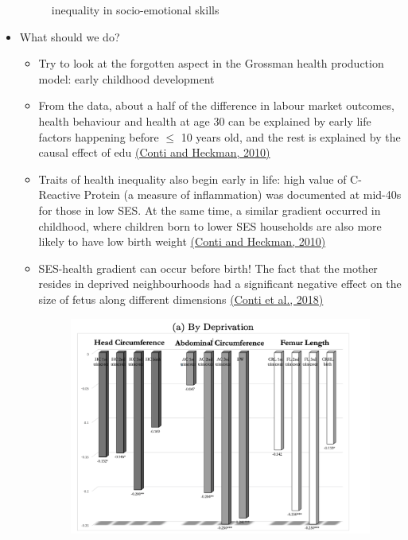 \begin{itemize}
\begin{figure}[H]
            \caption{inequality in socio-emotional skills}
            \label{SMinequality}
        \end{figure}
        \item What should we do?
        \begin{itemize}
            \item Try to look at the forgotten aspect in the Grossman health production model: early childhood development
            \item From the data, about a half of the difference in labour market outcomes, health behaviour and health at age 30 can be explained by early life factors happening before $\leq$ 10 years old, and the rest is explained by the causal effect of edu \href{https://www.nber.org/system/files/working_papers/w18466/w18466.pdf}{(Conti and Heckman, 2010)}
            \item Traits of health inequality also begin early in life: high value of C-Reactive Protein (a measure of inflammation) was documented at mid-40s for those in low SES. At the same time, a similar gradient occurred in childhood, where children born to lower SES households are also more likely to have low birth weight \href{https://www.nber.org/system/files/working_papers/w18466/w18466.pdf}{(Conti and Heckman, 2010)}
             \item SES-health gradient can occur before birth! The fact that the mother resides in deprived neighbourhoods had a significant negative effect on the size of fetus along different dimensions \href{https://www.econstor.eu/bitstream/10419/200319/1/1047143135.pdf}{(Conti et al., 2018)} 
            \begin{figure}[H]%
                \centering
                \includegraphics[width=13cm]{images/ch4/Prebirth gradient.png}

\end{figure}
\end{itemize}
\end{itemize}
